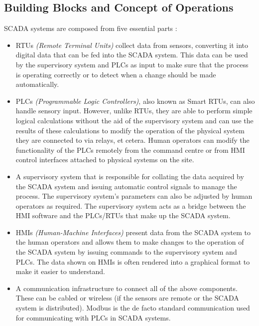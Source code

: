 \documentclass[12pt]{article}
\newcommand{\todo}[1]{\textcolor{red}{todo: #1}}
\begin{document}
\subsection{Building Blocks and Concept of Operations}
SCADA systems are composed from five essential parts \citep{site:allaboutcircuits:scadaintro:20150831,site:infosecinst:scadacritical:20130222}:
\begin{itemize}
  \item RTUs \textit{(Remote Terminal Units)} collect data from sensors, converting it into digital data that can be fed into the SCADA system. This data can be used by the supervisory system and PLCs as input to make sure that the process is operating correctly or to detect when a change should be made automatically.
  \item PLCs \textit{(Programmable Logic Controllers)}, also known as Smart RTUs, can also handle sensory input. However, unlike RTUs, they are able to perform simple logical calculations without the aid of the supervisory system and can use the results of these calculations to modify the operation of the physical system they are connected to via relays, et cetera. Human operators can modify the functionality of the PLCs remotely from the command centre or from HMI control interfaces attached to physical systems on the site.
  \item A supervisory system that is responsible for collating the data acquired by the SCADA system and issuing automatic control signals to manage the process. The supervisory system's parameters can also be adjusted by human operators as required. The supervisory system acts as a bridge between the HMI software and the PLCs/RTUs that make up the SCADA system.
  \item HMIs \textit{(Human-Machine Interfaces)} present data from the SCADA system to the human operators and allows them to make changes to the operation of the SCADA system by issuing commands to the supervisory system and PLCs. The data shown on HMIs is often rendered into a graphical format to make it easier to understand.
  \item A communication infrastructure to connect all of the above components. These can be cabled or wireless (if the sensors are remote or the SCADA system is distributed). Modbus is the de facto standard communication used for communicating with PLCs in SCADA systems.
\end{itemize}

\end{document}
